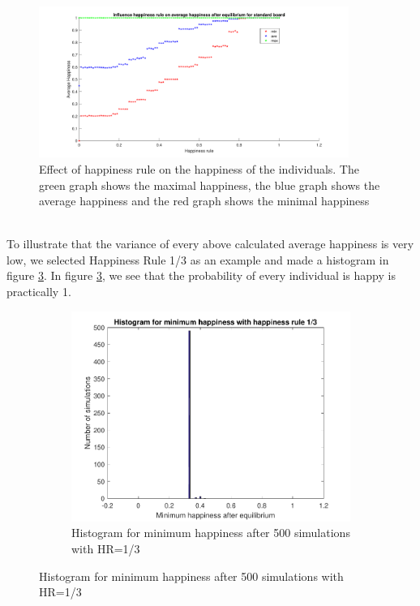 \begin{figure}[h!]
    \centering
    \includegraphics[width=0.9\textwidth]{happinessregel-gemhappinesseind-2.pdf}
    \caption{Effect of happiness rule on the happiness of the individuals. The green graph shows the maximal happiness, the blue graph shows the average happiness and the red graph shows the minimal happiness}
    \label{happyhappy}
\end{figure}
\\
To illustrate that the variance of every above calculated average happiness is very low, we  selected Happiness Rule 1/3 as an example and made a histogram in figure \ref{minhappy}. 
In figure \ref{minhappy}, we see that the probability of every individual is happy is practically 1.
\newpage
\begin{figure}[H]
    \centering
    \begin{subfigure}{0.8\textwidth}
        \includegraphics[width=\textwidth]{histogram_min_happiness_een_derde}
    \caption{Histogram for minimum happiness after 500 simulations with HR=1/3 }
    \label{minhappy}
    \end{subfigure}
\end{figure}
